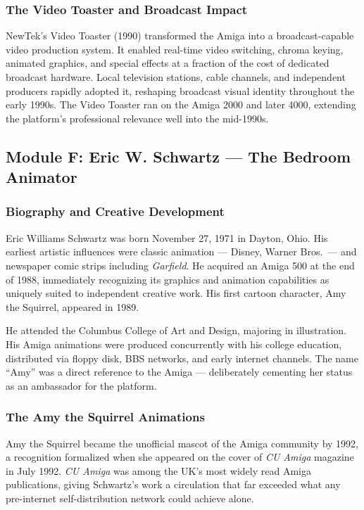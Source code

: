 \documentclass[11pt,letterpaper]{article}
\begin{document}
\subsubsection{The Video Toaster and Broadcast Impact}

NewTek's Video Toaster (1990) transformed the Amiga into a broadcast-capable video production system. It enabled real-time video switching, chroma keying, animated graphics, and special effects at a fraction of the cost of dedicated broadcast hardware. Local television stations, cable channels, and independent producers rapidly adopted it, reshaping broadcast visual identity throughout the early 1990s. The Video Toaster ran on the Amiga 2000 and later 4000, extending the platform's professional relevance well into the mid-1990s.

\subsection{Module F: Eric W. Schwartz --- The Bedroom Animator}

\subsubsection{Biography and Creative Development}

Eric Williams Schwartz was born November 27, 1971 in Dayton, Ohio. His earliest artistic influences were classic animation --- Disney, Warner Bros.\ --- and newspaper comic strips including \textit{Garfield}. He acquired an Amiga 500 at the end of 1988, immediately recognizing its graphics and animation capabilities as uniquely suited to independent creative work. His first cartoon character, Amy the Squirrel, appeared in 1989.

He attended the Columbus College of Art and Design, majoring in illustration. His Amiga animations were produced concurrently with his college education, distributed via floppy disk, BBS networks, and early internet channels. The name ``Amy'' was a direct reference to the Amiga --- deliberately cementing her status as an ambassador for the platform.

\subsubsection{The Amy the Squirrel Animations}

Amy the Squirrel became the unofficial mascot of the Amiga community by 1992, a recognition formalized when she appeared on the cover of \textit{CU Amiga} magazine in July 1992. \textit{CU Amiga} was among the UK's most widely read Amiga publications, giving Schwartz's work a circulation that far exceeded what any pre-internet self-distribution network could achieve alone.
\end{document}
